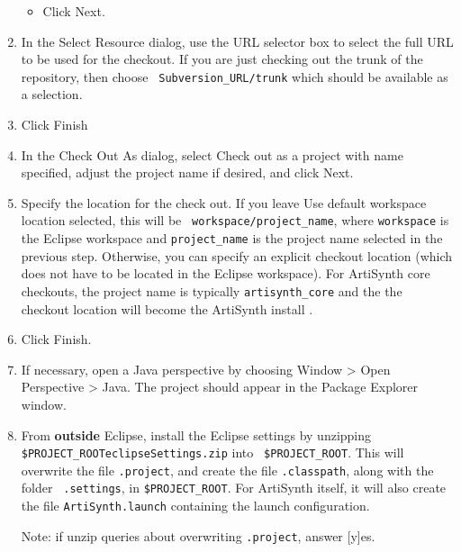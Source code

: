 \begin{enumerate}
\begin{itemize}
\item Click {\sf Next}.

\end{itemize}

\item In the {\sf Select Resource} dialog, use the {\sf URL} selector
box to select the full URL to be used for the checkout. If you are
just checking out the trunk of the repository, then choose {\tt
Subversion\_URL/trunk} which should be available as a selection.

\item Click {\sf Finish}

\item In the {\sf Check Out As} dialog, select {\sf Check out as a
project with name specified}, adjust the project name if desired,
and click {\sf Next}.

\item Specify the location for the check out. If you leave {\sf Use
default workspace location} selected, this will be {\tt
workspace/project\_name}, where {\tt workspace} is the Eclipse
workspace \directory and {\tt project\_name} is the project name
selected in the previous step. Otherwise, you can specify an explicit
checkout location (which does not have to be located in the Eclipse
workspace). For ArtiSynth core checkouts, the project name is
typically {\tt artisynth\_core} and the the checkout location will
become the ArtiSynth install .

\item Click {\sf Finish}.

\item If necessary, open a Java perspective by choosing {\sf Window >
Open Perspective > Java}. The project should appear in the {\sf
Package Explorer} window.

\item From {\bf outside} Eclipse, install the Eclipse settings by
unzipping {\tt \$PROJECT\_ROOT\SEP eclipse\-Settings.zip} into {\tt
\$PROJECT\_ROOT}. This will overwrite the file {\tt .project}, and
create the file {\tt .classpath}, along with the folder {\tt
.settings}, in {\tt \$PROJECT\_ROOT}.  For ArtiSynth itself, it will
also create the file {\tt ArtiSynth.launch} containing the launch
configuration.

\begin{sideblock}
Note: if unzip queries about overwriting {\tt .project}, answer [y]es.
\end{sideblock}


\end{enumerate}
